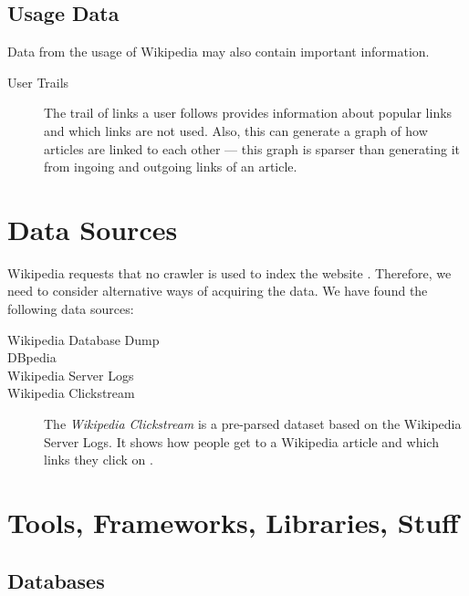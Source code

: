 \subsection{Usage Data}
Data from the usage of Wikipedia may also contain important information.
\begin{description}
  \item[User Trails] The trail of links a user follows provides information about popular links and which links are not used. Also, this can generate a graph of how articles are linked to each other --- this graph is sparser than generating it from ingoing and outgoing links of an article.
\end{description}

\section{Data Sources}
Wikipedia requests that no crawler is used to index the website . Therefore, we need to consider alternative ways of acquiring the data. We have found the following data sources:
\begin{description}
  \item[Wikipedia Database Dump]
  \item[DBpedia]
  \item[Wikipedia Server Logs] 
  \item[Wikipedia Clickstream] The \emph{Wikipedia Clickstream} is a pre-parsed dataset based on the Wikipedia Server Logs. It shows how people get to a Wikipedia article and which links they click on \cite{wiki-clickstream}.
\end{description}

\section{}

\section{Tools, Frameworks, Libraries, Stuff}\label{sec:selecting_tools}

\subsection{Databases}


